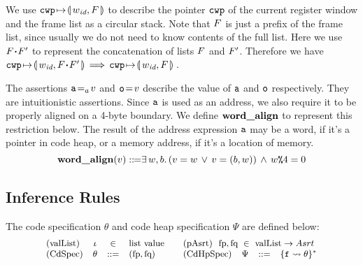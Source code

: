 We use $\texttt{cwp}\!\mapsto\!\llparenthesis\, w_{\textit{id}},F\,\rrparenthesis$ to describe the pointer
$\texttt{cwp}$ of the current register window and the frame
list as a circular stack.
Note that $F$ is just a prefix of the frame list,
since usually we do not need to know contents of
the full list. Here we use $F \!\bm{\cdot}\! F'$ to
represent the concatenation of lists $F$ and $F'$.
Therefore we have
$
\texttt{cwp}\!\mapsto\!\llparenthesis\, w_{\textit{id}},F \!\bm{\cdot}\! F'\,\rrparenthesis \,\Longrightarrow\,
\texttt{cwp}\!\mapsto\!\llparenthesis\, w_{\textit{id}},F\,\rrparenthesis
$\,.


The assertions ${\texttt{a}}\!=_{a}\!{v}$ and ${\texttt{o}}\!=\!{v}$
describe the value of $\texttt{a}$ and $\texttt{o}$ respectively. They are
intuitionistic assertions. Since $\texttt{a}$ is used as an address,
we also require it to be properly aligned on a 4-byte boundary. 
We define $\textbf{word\_align}{}$ to represent this restriction below. 
The result of the address expression $\texttt{a}$ may be a word, if 
it's a pointer in code heap, or a memory address, if it's a location 
of memory. 
\[
	\textbf{word\_align}{(v)} ::\!\!{=}
	\exists \, w, b. \, 
	(v = w \, \lor \, v = (b, w))
	\, \land \, w\texttt{\%}{4} = 0 
\]

\subsection{Inference Rules}
\label{subsec:inference rules}
\newcommand{\tinybftext}[1]{\textbf{\scriptsize{#1}}}


The code specification $\theta$ and code heap specification $\Psi$
are defined below:
\[
	\small
	\begin{array}{lccllccl}
		\text{(valList)} & \lgvl & \in & \text{list value} 
			& 
		\multicolumn{4}{l}
		{
			\quad
			\text{(pAsrt)} \ \
			\specpre,\specpost \ \in \ 
			\text{valList} \rightarrow Asrt
		}
		\\
		
		\text{(CdSpec)} & \Bspec & ::= & (\specpre, \specpost) 
			& \quad
		
		\text{(CdHpSpec)} & \Cspec & ::= & \{\lab{} \rightsquigarrow \Bspec\}^{*}
	\end{array}
\]

